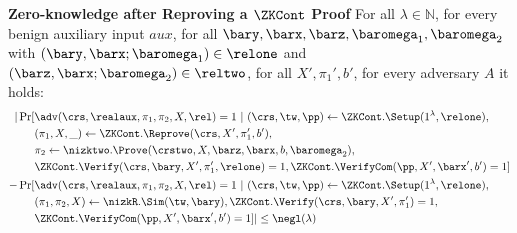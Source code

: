 \noindent \textbf{Zero-knowledge after Reproving a $\ZKCont$ Proof} For all $\lambda \in \mathbb{N}$, for every benign auxiliary input $aux$, 
for all $\bary,\barx,\barz, \baromega_1, \baromega_2$ with $(\bary, \barx; \baromega_1) \in \relone$ and $(\barz, \barx; \baromega_2) \in \reltwo$, for all $X',\pi_1', b'$, for every adversary $A$ it holds:
{\begin{align*}
		| \Pr[& \adv(\crs, \realaux, \pi_1,\pi_2, X, \rel) = 1 \ | \ (\crs, \tw, \pp) \leftarrow \ZKCont.\Setup (1^{\lambda}, \relone), \\
		& (\pi_1, X, \_) \leftarrow \ZKCont.\Reprove (\crs, X', \pi_1', b'), \\
		&\pi_2 \leftarrow \nizktwo.\Prove(\crstwo, X, \barz, \barx, b, \baromega_2), \\
		& \ZKCont.\Verify(\crs, \bary, X', \pi'_1, \relone) = 1, \ZKCont.\VerifyCom(\pp, X', \barx', b') = 1]  \\
		- \Pr[& \adv(\crs, \realaux, \pi_1,\pi_2, X, \rel) = 1 \ | \ (\crs, \tw, \pp) \leftarrow \ZKCont.\Setup (1^{\lambda}, \relone), \\ 
		& (\pi_1,\pi_2, X) \leftarrow \nizkR.\Sim(\tw, \bary), \ZKCont.\Verify(\crs, \bary, X', \pi'_1) = 1, \\
		& \ZKCont.\VerifyCom(\pp, X', \barx', b') = 1]| \leq \negl(\lambda)
\end{align*}}

